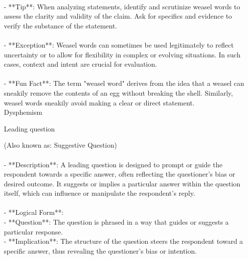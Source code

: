 \documentclass[a4paper,12pt,single,pdftex]{scrbook}
\begin{document}
    \\

    
      - **Tip**: When analyzing statements, identify and scrutinize weasel words to assess the clarity and validity of the claim. Ask for specifics and evidence to verify the substance of the statement.
    \\

    
      
    \\

    
      - **Exception**: Weasel words can sometimes be used legitimately to reflect uncertainty or to allow for flexibility in complex or evolving situations. In such cases, context and intent are crucial for evaluation.
    \\

    
      
    \\

    
      - **Fun Fact**: The term "weasel word" derives from the idea that a weasel can sneakily remove the contents of an egg without breaking the shell. Similarly, weasel words sneakily avoid making a clear or direct statement.
    \\

  

Dysphemism

Leading question
    
      (Also known as: Suggestive Question)
    \\

  
    
      
    \\

    
      - **Description**: A leading question is designed to prompt or guide the respondent towards a specific answer, often reflecting the questioner's bias or desired outcome. It suggests or implies a particular answer within the question itself, which can influence or manipulate the respondent's reply.
    \\

    
      
    \\

    
      - **Logical Form**:
    \\

    
        - **Question**: The question is phrased in a way that guides or suggests a particular response.
    \\

    
        - **Implication**: The structure of the question steers the respondent toward a specific answer, thus revealing the questioner's bias or intention.
    \\
\end{document}

